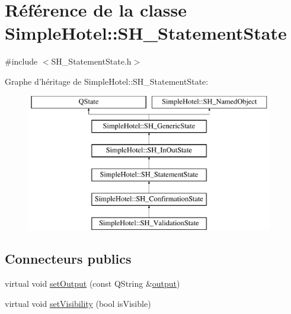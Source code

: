 \hypertarget{classSimpleHotel_1_1SH__StatementState}{\section{Référence de la classe Simple\-Hotel\-:\-:S\-H\-\_\-\-Statement\-State}
\label{classSimpleHotel_1_1SH__StatementState}
}


{\ttfamily \#include $<$S\-H\-\_\-\-Statement\-State.\-h$>$}

Graphe d'héritage de Simple\-Hotel\-:\-:S\-H\-\_\-\-Statement\-State\-:\begin{figure}[H]
\begin{center}
\leavevmode
\includegraphics[height=6.000000cm]{classSimpleHotel_1_1SH__StatementState}
\end{center}
\end{figure}
\subsection*{Connecteurs publics}
\begin{DoxyCompactItemize}
\item 
virtual void \hyperlink{classSimpleHotel_1_1SH__InOutState_a5e151d7b01cceb6766b6d83d4a9ac1aa}{set\-Output} (const Q\-String \&\hyperlink{classSimpleHotel_1_1SH__InOutState_a71b15e4d49b9c2aa540500065ceb39da}{output})
\item 
virtual void \hyperlink{classSimpleHotel_1_1SH__InOutState_a2da1edbe247e9b2661c81c9dc2c7ef8d}{set\-Visibility} (bool is\-Visible)
\end{DoxyCompactItemize}
